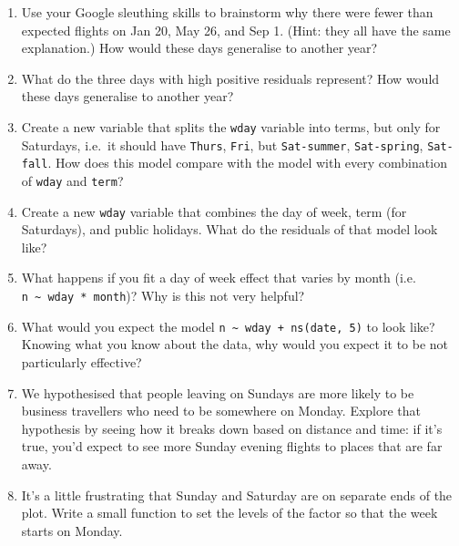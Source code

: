 \documentclass[]{book}
\newenvironment{Shaded}{\begin{snugshade}}{\end{snugshade}}
\newcommand{\KeywordTok}[1]{\textcolor[rgb]{0.13,0.29,0.53}{\textbf{{#1}}}}
\newcommand{\DecValTok}[1]{\textcolor[rgb]{0.00,0.00,0.81}{{#1}}}
\newcommand{\StringTok}[1]{\textcolor[rgb]{0.31,0.60,0.02}{{#1}}}
\newcommand{\CommentTok}[1]{\textcolor[rgb]{0.56,0.35,0.01}{\textit{{#1}}}}
\newcommand{\NormalTok}[1]{{#1}}
\begin{document}
\begin{enumerate}
\def\labelenumi{\arabic{enumi}.}
\item
  Use your Google sleuthing skills to brainstorm why there were fewer
  than expected flights on Jan 20, May 26, and Sep 1. (Hint: they all
  have the same explanation.) How would these days generalise to another
  year?
\item
  What do the three days with high positive residuals represent? How
  would these days generalise to another year?

\begin{Shaded}
\end{Shaded}
\item
  Create a new variable that splits the \texttt{wday} variable into
  terms, but only for Saturdays, i.e.~it should have \texttt{Thurs},
  \texttt{Fri}, but \texttt{Sat-summer}, \texttt{Sat-spring},
  \texttt{Sat-fall}. How does this model compare with the model with
  every combination of \texttt{wday} and \texttt{term}?
\item
  Create a new \texttt{wday} variable that combines the day of week,
  term (for Saturdays), and public holidays. What do the residuals of
  that model look like?
\item
  What happens if you fit a day of week effect that varies by month
  (i.e. \texttt{n\ \textasciitilde{}\ wday\ *\ month})? Why is this not
  very helpful?
\item
  What would you expect the model
  \texttt{n\ \textasciitilde{}\ wday\ +\ ns(date,\ 5)} to look like?
  Knowing what you know about the data, why would you expect it to be
  not particularly effective?
\item
  We hypothesised that people leaving on Sundays are more likely to be
  business travellers who need to be somewhere on Monday. Explore that
  hypothesis by seeing how it breaks down based on distance and time: if
  it's true, you'd expect to see more Sunday evening flights to places
  that are far away.
\item
  It's a little frustrating that Sunday and Saturday are on separate
  ends of the plot. Write a small function to set the levels of the
  factor so that the week starts on Monday.
\end{enumerate}
\end{document}
